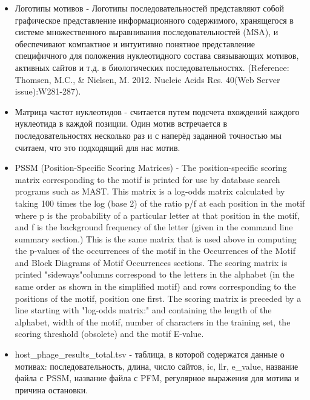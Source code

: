 \documentclass[a4paper,12pt]{article}
\begin{document}
\begin{itemize}
    \item Логотипы мотивов - Логотипы последовательностей представляют собой графическое представление информационного
    содержимого, хранящегося в системе множественного выравнивания последовательностей (MSA), и обеспечивают
    компактное и интуитивно понятное представление специфичного для положения нуклеотидного состава связывающих
    мотивов, активных сайтов и т.д. в биологических последовательностях. (Reference: Thomsen, M.C., \& Nielsen, M.
    2012. Nucleic Acids Res. 40(Web Server issue):W281-287).
   
    \item Матрица частот нуклеотидов - считается путем подсчета вхождений каждого нуклеотида в каждой позиции. Один мотив встречается в последовательностях несколько раз и с наперёд заданной точностью мы считаем, что это подходящий для нас мотив.
    
    \item PSSM (Position-Specific Scoring Matrices) - The position-specific scoring matrix corresponding to the motif
    is printed for use by database search programs such as MAST. This matrix is a log-odds matrix calculated by taking
    100 times the log (base 2) of the ratio p/f at each position in the motif where p is the probability of a
    particular letter at that position in the motif, and f is the background frequency of the letter (given in the
    command line summary section.) This is the same matrix that is used above in computing the p-values of the
    occurrences of the motif in the Occurrences of the Motif and Block Diagrams of Motif Occurrences sections. The
    scoring matrix is printed "sideways"\-\-columns correspond to the letters in the alphabet (in the same order as
    shown in the simplified motif) and rows corresponding to the positions of the motif, position one first. The
    scoring matrix is preceded by a line starting with "log-odds matrix:" and containing the length of the alphabet,
    width of the motif, number of characters in the training set, the scoring threshold (obsolete) and the motif
    E-value. \cite{memeres} 
    
    \item host\_phage\_results\_total.tsv - таблица, в которой содержатся данные о мотивах: последовательность, длина, число сайтов, ic, llr, e\_value, название файла с PSSM, название файла с PFM, регулярное выражения для мотива и причина остановки.
\end{itemize}
\end{document}
